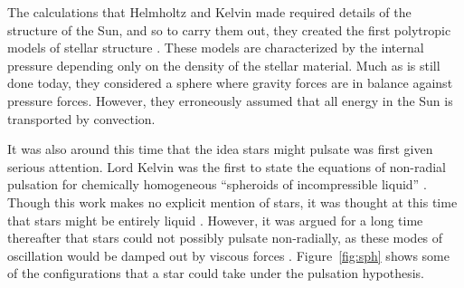The calculations that Helmholtz and Kelvin made required details of the structure of the Sun, and so to carry them out, they created the first polytropic models of stellar structure \citep[e.g.,][]{ARNY1990211}. 
These models are characterized by the internal pressure depending only on the density of the stellar material. 
Much as is still done today, they considered a sphere where gravity forces are in balance against pressure forces. 
However, they erroneously assumed that all energy in the Sun is transported by convection. 

It was also around this time that the idea stars might pulsate was first given serious attention. %
Lord Kelvin was the first to state the equations of non-radial pulsation for chemically homogeneous ``spheroids of incompressible liquid'' \citep{1863RSPT..153..583T}. 
Though this work makes no explicit mention of stars, it was thought at this time that stars might be entirely liquid \citep[e.g.,][]{ARNY1990211}. 
However, it was argued for a long time thereafter that stars could not possibly pulsate non-radially, as these modes of oscillation would be damped out by viscous forces \citep[e.g.,][]{1938ApJ....88..189P}. 
Figure~\ref{fig:sph} shows some of the configurations that a star could take under the pulsation hypothesis. 


